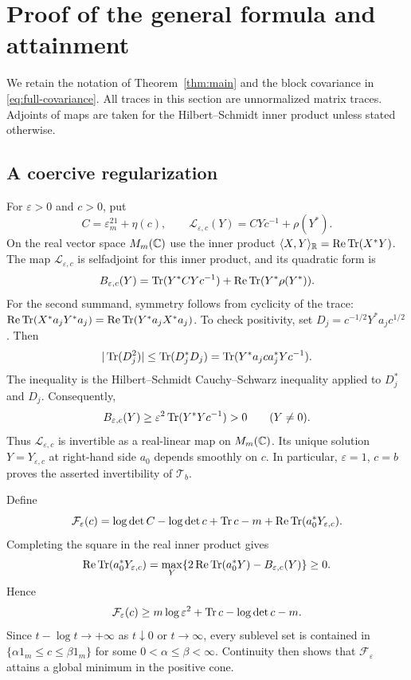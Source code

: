 \section{Proof of the general formula and attainment}\label{sec:main-proof}

We retain the notation of Theorem~\ref{thm:main} and the block covariance in \eqref{eq:full-covariance}.
All traces in this section are unnormalized matrix traces.
Adjoints of maps are taken for the Hilbert--Schmidt inner product unless stated otherwise.

\subsection{A coercive regularization}
For $\varepsilon>0$ and $c>0$, put
\[
 C=\varepsilon^21_m+\eta(c),\qquad
 \mathcal L_{\varepsilon,c}(Y)=CYc^{-1}+\rho(Y^*).
\]
On the real vector space $M_m(\mathbb C)$ use the inner product $\langle X,Y\rangle_{\mathbb R}=\operatorname{Re}\operatorname{Tr}(X^*Y)$.
The map $\mathcal L_{\varepsilon,c}$ is selfadjoint for this inner product, and its quadratic form is
\begin{equation}\label{eq:quadratic-form}
 B_{\varepsilon,c}(Y)=\operatorname{Tr}(Y^*CYc^{-1})
             +\operatorname{Re}\operatorname{Tr}(Y^*\rho(Y^*)).
\end{equation}
For the second summand, symmetry follows from cyclicity of the trace:
$\operatorname{Re}\operatorname{Tr}(X^*a_jY^*a_j) =\operatorname{Re}\operatorname{Tr}(Y^*a_jX^*a_j)$.
To check positivity, set $D_j=c^{-1/2}Y^*a_jc^{1/2}$.
Then
\[
 |\operatorname{Tr}(D_j^2)|\le\operatorname{Tr}(D_j^*D_j)
      =\operatorname{Tr}(Y^*a_jca_j^*Yc^{-1}).
\]
The inequality is the Hilbert--Schmidt Cauchy--Schwarz inequality applied to $D_j^*$ and $D_j$.
Consequently,
\begin{equation}\label{eq:quadratic-lower-bound}
 B_{\varepsilon,c}(Y)\ge
           \varepsilon^2\operatorname{Tr}(Y^*Yc^{-1})>0\qquad(Y\ne0).
\end{equation}
Thus $\mathcal L_{\varepsilon,c}$ is invertible as a real-linear map on $M_m(\mathbb C)$.
Its unique solution $Y=Y_{\varepsilon,c}$ at right-hand side $a_0$ depends smoothly on $c$.
In particular, $\varepsilon=1$, $c=b$ proves the asserted invertibility of $\mathcal T_b$.

Define
\begin{equation}\label{eq:regularized-objective}
 \mathcal F_\varepsilon(c)=\log\det C-\log\det c
       +\operatorname{Tr} c-m+\operatorname{Re}\operatorname{Tr}(a_0^*Y_{\varepsilon,c}).
\end{equation}
Completing the square in the real inner product gives
\begin{equation}\label{eq:inner-maximum}
 \operatorname{Re}\operatorname{Tr}(a_0^*Y_{\varepsilon,c})
 =\max_Y\{2\operatorname{Re}\operatorname{Tr}(a_0^*Y)-B_{\varepsilon,c}(Y)\}
 \ge0.
\end{equation}
Hence
\[
 \mathcal F_\varepsilon(c)\ge
 m\log\varepsilon^2+\operatorname{Tr} c-\log\det c-m.
\]
Since $t-\log t\to+\infty$ as $t\downarrow0$ or $t\to\infty$, every sublevel set is contained in $\{\alpha 1_m\le c\le\beta 1_m\}$ for some $0<\alpha\le\beta<\infty$.
Continuity then shows that $\mathcal F_\varepsilon$ attains a global minimum in the positive cone.

